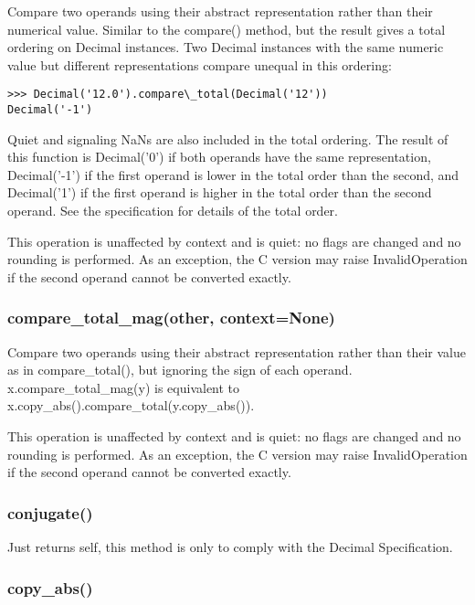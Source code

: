 Compare two operands using their abstract representation rather than their numerical value. Similar to the compare() method, but the result gives a total ordering on Decimal instances. Two Decimal instances with the same numeric value but different representations compare unequal in this ordering:

\begin{lstlisting}
>>> Decimal('12.0').compare\_total(Decimal('12'))
Decimal('-1')
\end{lstlisting}

Quiet and signaling NaNs are also included in the total ordering. The result of this function is Decimal('0') if both operands have the same representation, Decimal('-1') if the first operand is lower in the total order than the second, and Decimal('1') if the first operand is higher in the total order than the second operand. See the specification for details of the total order.

This operation is unaffected by context and is quiet: no flags are changed and no rounding is performed. As an exception, the C version may raise InvalidOperation if the second operand cannot be converted exactly.

\subsubsection{compare\_total\_mag(other, context=None)}

Compare two operands using their abstract representation rather than their value as in compare\_total(), but ignoring the sign of each operand. x.compare\_total\_mag(y) is equivalent to x.copy\_abs().compare\_total(y.copy\_abs()).

This operation is unaffected by context and is quiet: no flags are changed and no rounding is performed. As an exception, the C version may raise InvalidOperation if the second operand cannot be converted exactly.


\subsubsection{conjugate()}

Just returns self, this method is only to comply with the Decimal Specification.


\subsubsection{copy\_abs()}

